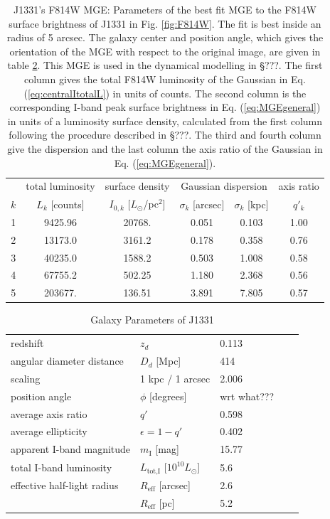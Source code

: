 \begin{table}
\centering
\caption{J1331's F814W MGE: Parameters of the best fit MGE to the F814W surface brightness of J1331 in Fig. \ref{fig:F814W}. The fit is best inside an radius of 5 arcsec. The galaxy center and position angle, which gives the orientation of the MGE with respect to the original image, are given in table \ref{tab:galaxyparameters}. This MGE is used in the dynamical modelling in \S ???.  The first column gives the total F814W luminosity of the Gaussian in Eq. (\ref{eq:centralItotalL}) in units of counts. The second column is the corresponding I-band peak surface brightness in Eq. (\ref{eq:MGEgeneral}) in units of a luminosity surface density, calculated from the first column following the procedure described in \S ???. The third and fourth column give the dispersion and the last column the axis ratio of the Gaussian in Eq. (\ref{eq:MGEgeneral}).}
\begin{tabular}{cccccc}
\hline
 & total luminosity  & surface density & \multicolumn{2}{c}{Gaussian dispersion} & axis ratio\\
$k$  & $L_k$ [counts] & $I_{0,k}$ [$L_\odot$/pc$^2$] & $\sigma_k$ [arcsec] & $\sigma_k$ [kpc] & $q'_k$\\\hline
1  &     9425.96 &      20768.  &  0.051   & 0.103  & 1.00\\
2  &    13173.0 &        3161.2 &  0.178   & 0.358  & 0.76\\
3  &    40235.0 &        1588.2 &  0.503   & 1.008  & 0.58\\
4  &    67755.2 &         502.25&  1.180   & 2.368  & 0.56\\
5  &    203677. &         136.51&  3.891   & 7.805  & 0.57\\\hline
\end{tabular}
\label{tab:MGEF814W}
\end{table}


\begin{table}
\centering
\caption{Galaxy Parameters of J1331}
\begin{tabular}{lllrl}
\hline
redshift                  & $z_d$ & 0.113 & \citep{SWELLSIII}\\
angular diameter distance & $D_d$ [Mpc] & 414 & \\
scaling                   & 1 kpc / 1 arcsec & 2.006 & \\
position angle            & $\phi$ [degrees] & wrt what???\\
average axis ratio & $q'$ & 0.598\\
average ellipticity & $\epsilon = 1 - q'$ & 0.402 & \\
apparent I-band magnitude & $m_\text{I}$ [mag] & 15.77 & \\
total I-band luminosity & $L_\text{tot,I}$ [$10^{10} L_\odot$] & 5.6 & \\
effective half-light radius & $R_\text{eff}$ [arcsec] & 2.6 & \\
& $R_\text{eff}$ [pc]& 5.2 & \\
\hline
\end{tabular}
\label{tab:galaxyparameters}
\end{table}


